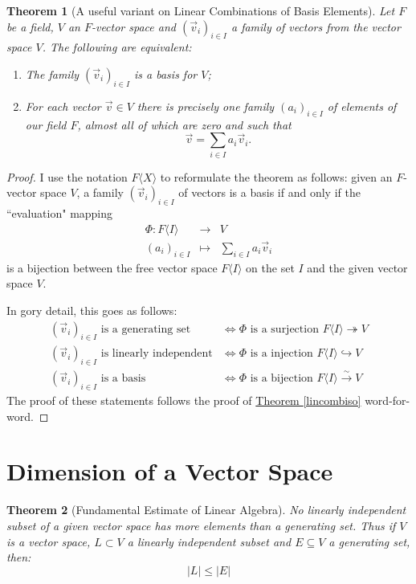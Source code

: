 \documentclass[11pt]{amsbook}
\newtheorem{theorem}{Theorem}[section]
\theoremstyle{definition}
\begin{document}
\begin{theorem}[A useful variant on Linear Combinations of Basis Elements]\label{lincombbasvar}
Let $F$ be a field, $V$ an $F$-vector space and $(\vec{v}_i)_{i\in I}$ a family of vectors from the vector space $V$. The following are equivalent:
\begin{enumerate}
\item The family $(\vec{v}_i)_{i\in I}$ is a basis for $V$;
\item For each vector $\vec{v}\in V$ there is precisely one family $(a_i)_{i\in I}$ of elements of our field $F$, almost all of which are zero and such that $$\vec{v} = \sum_{i\in I} a_i \vec{v}_i.$$
\end{enumerate}
\end{theorem}
\begin{proof} I use the notation $F\langle X \rangle$ to reformulate the theorem as follows: given an $F$-vector space $V$, a family $(\vec{v}_i)_{i\in I}$ of vectors is a basis if and only if the ``evaluation" mapping \begin{eqnarray*} \Phi : F\langle I \rangle & \to & V \\ (a_i)_{i\in I} & \mapsto & \sum_{i\in I}a_i \vec{v}_i\end{eqnarray*} is a bijection between the free vector space $F\langle I \rangle$ on the set $I$ and the given vector space $V$.

In gory detail, this goes as follows:
\begin{align*}
(\vec{v}_i)_{i\in I} \text{ is a generating set}  & \Leftrightarrow  \Phi \text{ is a surjection }  F\langle I \rangle \twoheadrightarrow V \\
(\vec{v}_i)_{i\in I} \text{ is linearly independent}  & \Leftrightarrow \Phi \text{ is a injection }  F\langle I \rangle \hookrightarrow V \\
(\vec{v}_i)_{i\in I} \text{ is a basis}  & \Leftrightarrow \Phi \text{ is a bijection }  F\langle I \rangle \stackrel{\sim}{\to} V
\end{align*}
The proof of these statements follows the proof of \hyperref[lincombiso]{Theorem \ref{lincombiso}} word-for-word.
\end{proof}

\section{Dimension of a Vector Space}


\begin{theorem}[Fundamental Estimate of Linear Algebra] \label{estimate}
No linearly independent subset of a given vector space has more elements than a generating set. Thus if $V$ is a vector space, $L\subset V$ a linearly independent subset and $E\subseteq V$ a generating set, then: $$|L|\leqslant |E|$$
\end{theorem}
\end{document}
